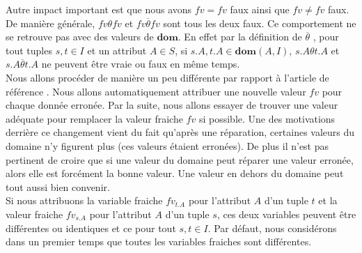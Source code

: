 \documentclass[letterpaper, 12pt]{report}
\theoremstyle{definition}
\newcommand{\dom}{\mathbf{dom}}
\begin{document}
Autre impact important est que nous avons $fv = fv$ faux ainsi que $fv \neq fv$ faux. De manière générale, $fv \theta fv$ et $fv \overline{\theta} fv$ sont tous les deux faux. Ce comportement ne se retrouve pas avec des valeurs de $\dom$. En effet par la définition de $\overline{\theta}$ , pour tout tuples $s,t \in I$ et un attribut $A \in S$, si $s.A,t.A \in \dom(A,I)$, $s.A \theta t.A$ et $s.A \overline{\theta} t.A$ ne peuvent être vraie ou faux en même temps.\\

Nous allons procéder de manière un peu différente par rapport à l'article de référence \cite{main}. Nous allons automatiquement attribuer une nouvelle valeur $fv$ pour chaque donnée erronée. Par la suite, nous allons essayer de trouver une valeur adéquate pour remplacer la valeur fraiche $fv$ si possible. Une des motivations derrière ce changement vient du fait qu'après une réparation, certaines valeurs du domaine n'y figurent plus (ces valeurs étaient erronées). De plus il n'est pas pertinent de croire que si une valeur du domaine peut réparer une valeur erronée, alors elle est forcément la bonne valeur. Une valeur en dehors du domaine peut tout aussi bien convenir.\\

Si nous attribuons la variable fraiche $fv_{t.A}$ pour l'attribut $A$ d'un tuple $t$ et la valeur fraiche $fv_{s.A}$ pour l'attribut $A$ d'un tuple $s$, ces deux variables peuvent être différentes ou identiques et ce pour tout $s,t \in I$. Par défaut, nous considérons dans un premier temps que toutes les variables fraiches sont différentes.\\
\end{document}
